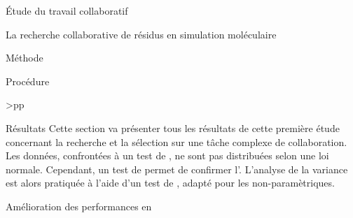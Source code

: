 \documentclass[myfrancais]{mythesis}
\begin{document}
\begin{mypart}{Étude du travail collaboratif}
\begin{mychapter}{La recherche collaborative de résidus en simulation moléculaire}
\begin{mysection}{Méthode}
\begin{mysubsection}{Procédure}
\begin{mytable}
\begin{mytabular}{>{\bfseries}p{\exponefirstcolumn}p{\exponesecondcolumn}}
							\mymiddlerule[\heavyrulewidth]
							 \\
							\mybottomrule
						\end{mytabular}
					\end{mytable}
				\end{mysubsection}
			\end{mysection}
			\begin{mysection}{Résultats}
				Cette section va présenter tous les résultats de cette première étude concernant la recherche et la sélection sur une tâche complexe de collaboration.
				Les données, confrontées à un test de , ne sont pas distribuées selon une loi normale.
				Cependant, un test de  permet de confirmer l'.
				L'analyse de la variance est alors pratiquée à l'aide d'un test de , adapté pour les  non-paramètriques.
				\begin{mysubsection}{Amélioration des performances en }
					\begin{myfigure}

\end{myfigure}
\end{mysubsection}
\end{mysection}
\end{mychapter}
\end{mypart}
\end{document}
